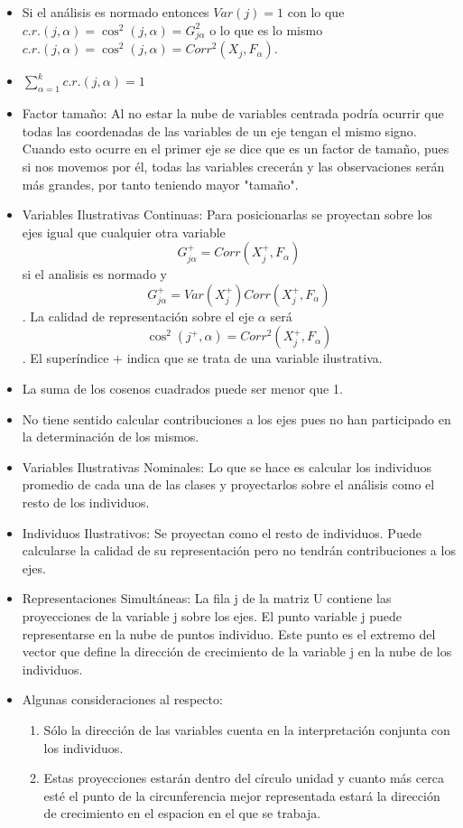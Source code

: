 \documentclass{article}
\begin{document}
\begin{itemize}
    \item Si el análisis es normado entonces $Var(j)=1$ con lo que $c.r.(j,\alpha)=\cos^2(j,\alpha)=G^2_{j\alpha}$ o lo que es lo mismo $c.r.(j,\alpha)=\cos^2(j,\alpha)=Corr^2(X_j,F_\alpha)$.
    \item $\sum_{\alpha=1}^{k}c.r.(j,\alpha)=1$
    \item Factor tamaño: Al no estar la nube de variables centrada podría ocurrir que todas las coordenadas de las variables de un eje tengan el mismo signo. Cuando esto ocurre en el primer eje se dice que es un factor de tamaño, pues si nos movemos por él, todas las variables crecerán y las observaciones serán más grandes, por tanto teniendo mayor "tamaño".
    \item Variables Ilustrativas Continuas: Para posicionarlas se proyectan sobre los ejes igual que cualquier otra variable \[G^+_{j\alpha}=Corr(X^+_j,F_\alpha)\] si el analisis es normado y \[G^+_{j\alpha}=Var(X^+_j)Corr(X^+_j,F_\alpha)\]. La calidad de representación sobre el eje $\alpha$ será \[\cos^2(j^+,\alpha)=Corr^2(X^+_j,F_\alpha)\]. El superíndice $+$ indica que se trata de una variable ilustrativa.
    \item La suma de los cosenos cuadrados puede ser menor que 1.
    \item No tiene sentido calcular contribuciones a los ejes pues no han participado en la determinación de los mismos.
    \item Variables Ilustrativas Nominales: Lo que se hace es calcular los individuos promedio de cada una de las clases y proyectarlos sobre el análisis como el resto de los individuos.
    \item Individuos Ilustrativos: Se proyectan como el resto de individuos. Puede calcularse la calidad de su representación pero no tendrán contribuciones a los ejes.
    \item Representaciones Simultáneas: La fila j de la matriz U contiene las proyecciones de la variable j sobre los ejes. El punto variable j puede representarse en la nube de puntos individuo. Este punto es el extremo del vector que define la dirección de crecimiento de la variable j en la nube de los individuos.
    \item Algunas consideraciones al respecto:
          \begin{enumerate}
              \item Sólo la dirección de las variables cuenta en la interpretación conjunta con los individuos.
              \item Estas proyecciones estarán dentro del círculo unidad y cuanto más cerca esté el punto de la circunferencia mejor representada estará la dirección de crecimiento en el espacion en el que se trabaja.

\end{enumerate}
\end{itemize}
\end{document}
